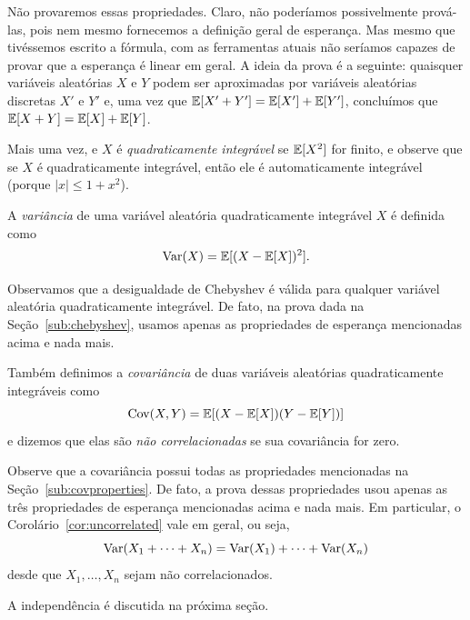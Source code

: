 Não provaremos essas propriedades.
Claro, não poderíamos possivelmente prová-las, pois nem mesmo fornecemos a definição geral de esperança.
Mas mesmo que tivéssemos escrito a fórmula, com as ferramentas atuais não seríamos capazes de provar que a esperança é linear em geral.
A ideia da prova é a seguinte: quaisquer variáveis aleatórias $ X $ e $ Y $ podem ser aproximadas por variáveis aleatórias discretas $ X' $ e $ Y' $ e, uma vez que $ \mathbb{E}[X'+Y']=\mathbb{E}[X']+\mathbb{E}[Y'] $, concluímos que $ \mathbb{E}[X+Y]=\mathbb{E}[X]+\mathbb{E}[Y] $.

Mais uma vez, e $ X $ é \emph{quadraticamente integrável} se $ \mathbb{E}[X^2] $ for finito, e observe que se $ X $ é quadraticamente integrável, então ele é automaticamente integrável (porque $ |x|\leq 1+x^2 $).

\begin{definition}
[Variância]
A \emph{variância} de uma variável aleatória quadraticamente integrável $ X $ é definida como
\[
\mathrm{Var}(X) = \mathbb{E}[(X-\mathbb{E}[X])^2]
.
\]
\end{definition}

Observamos que a desigualdade de Chebyshev é válida para qualquer variável aleatória quadraticamente integrável.
De fato, na prova dada na Seção~\ref{sub:chebyshev}, usamos apenas as propriedades de esperança mencionadas acima e nada mais.

\begin{definition}
[Covariância]
Também definimos a \emph{covariância} de duas variáveis aleatórias quadraticamente integráveis como
\[
\mathrm{Cov}(X,Y) = \mathbb{E}[(X-\mathbb{E}[X])(Y-\mathbb{E}[Y])]
\]
e dizemos que elas são \emph{não correlacionadas} se sua covariância for zero.
\end{definition}
Observe que a covariância possui todas as propriedades mencionadas na Seção~\ref{sub:covproperties}.
De fato, a prova dessas propriedades usou apenas as três propriedades de esperança mencionadas acima e nada mais.
Em particular, o Corolário~\ref{cor:uncorrelated} vale em geral, ou seja,
\[
\mathrm{Var}(X_1+\dots+X_n)
=
\mathrm{Var}(X_1)
+\dots+
\mathrm{Var}(X_n)
\]
desde que $ X_1,\dots,X_n $ sejam não correlacionados.

A independência é discutida na próxima seção.

